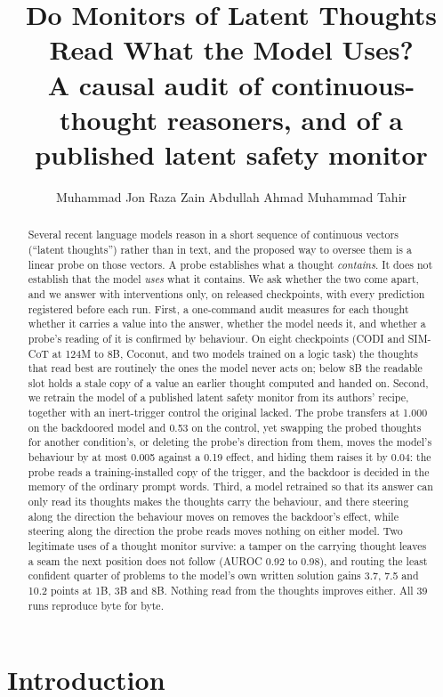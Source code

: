 \documentclass{article}
\title{Do Monitors of Latent Thoughts Read What the Model Uses?\\[3pt]\large A causal audit of continuous-thought reasoners, and of a published latent safety monitor}
\author{%
  Muhammad Jon Raza
  \And
  Zain Abdullah Ahmad
  \And
  Muhammad Tahir
}
\begin{document}
\maketitle

\begin{abstract}
Several recent language models reason in a short sequence of continuous vectors (``latent thoughts'') rather than in text, and the proposed way to oversee them is a linear probe on those vectors. A probe establishes what a thought \emph{contains}. It does not establish that the model \emph{uses} what it contains. We ask whether the two come apart, and we answer with interventions only, on released checkpoints, with every prediction registered before each run. First, a one-command audit measures for each thought whether it carries a value into the answer, whether the model needs it, and whether a probe's reading of it is confirmed by behaviour. On eight checkpoints (CODI and SIM-CoT at 124M to 8B, Coconut, and two models trained on a logic task) the thoughts that read best are routinely the ones the model never acts on; below 8B the readable slot holds a stale copy of a value an earlier thought computed and handed on. Second, we retrain the model of a published latent safety monitor \citep{ramjee2026ulterior} from its authors' recipe, together with an inert-trigger control the original lacked. The probe transfers at 1.000 on the backdoored model and 0.53 on the control, yet swapping the probed thoughts for another condition's, or deleting the probe's direction from them, moves the model's behaviour by at most 0.005 against a 0.19 effect, and hiding them raises it by 0.04: the probe reads a training-installed copy of the trigger, and the backdoor is decided in the memory of the ordinary prompt words. Third, a model retrained so that its answer can only read its thoughts makes the thoughts carry the behaviour, and there steering along the direction the behaviour moves on removes the backdoor's effect, while steering along the direction the probe reads moves nothing on either model. Two legitimate uses of a thought monitor survive: a tamper on the carrying thought leaves a seam the next position does not follow (AUROC 0.92 to 0.98), and routing the least confident quarter of problems to the model's own written solution gains 3.7, 7.5 and 10.2 points at 1B, 3B and 8B. Nothing read from the thoughts improves either. All 39 runs reproduce byte for byte.
\end{abstract}

\section{Introduction}
\end{document}
